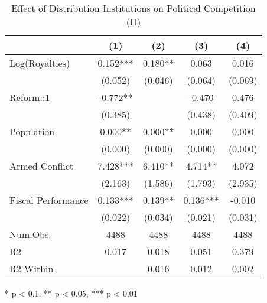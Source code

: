 \begin{table}[t]
\caption*{
{\large Effect of Distribution Institutions on Political Competition (II)}
} 
\fontsize{12.0pt}{14.4pt}\selectfont
\begin{tabular*}{\linewidth}{@{\extracolsep{\fill}}lcccc}
\toprule
  & (1) & (2) & (3) & (4) \\ 
\midrule\addlinespace[2.5pt]
Log(Royalties) & 0.152*** & 0.180** & 0.063 & 0.016 \\ 
 & (0.052) & (0.046) & (0.064) & (0.069) \\ 
Reform::1 & -0.772** &  & -0.470 & 0.476 \\ 
 & (0.385) &  & (0.438) & (0.409) \\ 
Population & 0.000** & 0.000** & 0.000 & 0.000 \\ 
 & (0.000) & (0.000) & (0.000) & (0.000) \\ 
Armed Conflict & 7.428*** & 6.410** & 4.714** & 4.072 \\ 
 & (2.163) & (1.586) & (1.793) & (2.935) \\ 
Fiscal Performance & 0.133*** & 0.139** & 0.136*** & -0.010 \\ 
{} & {(0.022)} & {(0.034)} & {(0.021)} & {(0.031)} \\ 
Num.Obs. & 4488 & 4488 & 4488 & 4488 \\ 
R2 & 0.017 & 0.018 & 0.051 & 0.379 \\ 
R2 Within &  & 0.016 & 0.012 & 0.002 \\ 
\bottomrule
\end{tabular*}
\begin{minipage}{\linewidth}
* p < 0.1, ** p < 0.05, *** p < 0.01\\
\end{minipage}
\end{table}
